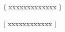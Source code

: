 \documentclass{article}
\begin{document}

(        xxxxxxxxxxxxx      )

[         xxxxxxxxxxxx ]

\end{document}
